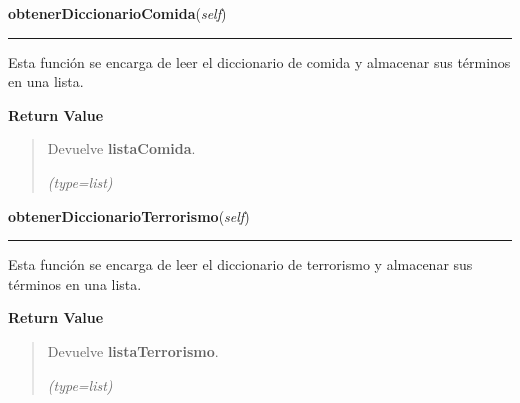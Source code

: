     \label{funcionesTwitter:FuncionesTwitter:obtenerDiccionarioComida}

    \vspace{0.5ex}

\hspace{.8\funcindent}\begin{boxedminipage}{\funcwidth}

    \raggedright \textbf{obtenerDiccionarioComida}(\textit{self})

    \vspace{-1.5ex}

    \rule{\textwidth}{0.5\fboxrule}
\setlength{\parskip}{2ex}
    Esta función se encarga de leer el diccionario de comida y almacenar 
    sus términos en una lista.

\setlength{\parskip}{1ex}
      \textbf{Return Value}
    \vspace{-1ex}

      \begin{quote}
      Devuelve \textbf{listaComida}.

      {\it (type=list)}

      \end{quote}

    \end{boxedminipage}

    \label{funcionesTwitter:FuncionesTwitter:obtenerDiccionarioTerrorismo}

    \vspace{0.5ex}

\hspace{.8\funcindent}\begin{boxedminipage}{\funcwidth}

    \raggedright \textbf{obtenerDiccionarioTerrorismo}(\textit{self})

    \vspace{-1.5ex}

    \rule{\textwidth}{0.5\fboxrule}
\setlength{\parskip}{2ex}
    Esta función se encarga de leer el diccionario de terrorismo y 
    almacenar sus términos en una lista.

\setlength{\parskip}{1ex}
      \textbf{Return Value}
    \vspace{-1ex}

      \begin{quote}
      Devuelve \textbf{listaTerrorismo}.

      {\it (type=list)}

      \end{quote}

    \end{boxedminipage}

